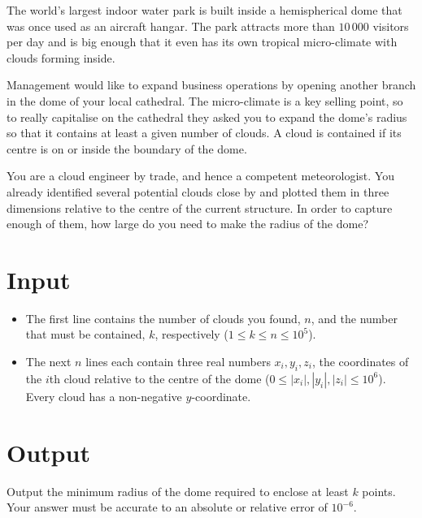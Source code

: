 
The world's largest indoor water park is built inside a hemispherical dome that
was once used as an aircraft hangar. The park attracts more than $10\,000$
visitors per day and is big enough that it even has its own tropical
micro-climate with clouds forming inside.

Management would like to expand business operations by opening another branch
in the dome of your local cathedral. The micro-climate is a key selling point,
so to really capitalise on the cathedral they asked you to expand the dome's
radius so that it contains at least a given number of clouds. A cloud is
contained if its centre is on or inside the boundary of the dome.


You are a cloud engineer by trade, and hence a competent meteorologist. You
already identified several potential clouds close by and plotted them in three
dimensions relative to the centre of the current structure. In order to capture
enough of them, how large do you need to make the radius of the dome?

\section*{Input}

\begin{itemize}
  \item The first line contains the number of clouds you found, $n$, and the
        number that must be contained, $k$, respectively
        ($1 \le k \le n \le 10^5$).
  \item The next $n$ lines each contain three real numbers $x_i, y_i, z_i$, the
        coordinates of the $i$th cloud relative to the centre of the dome
        ($0 \le |x_i|, |y_i|, |z_i| \le 10^6$). Every cloud has a non-negative
        $y$-coordinate.
\end{itemize}

\section*{Output}

Output the minimum radius of the dome required to enclose at least $k$ points.
Your answer must be accurate to an absolute or relative error of $10^{-6}$.

